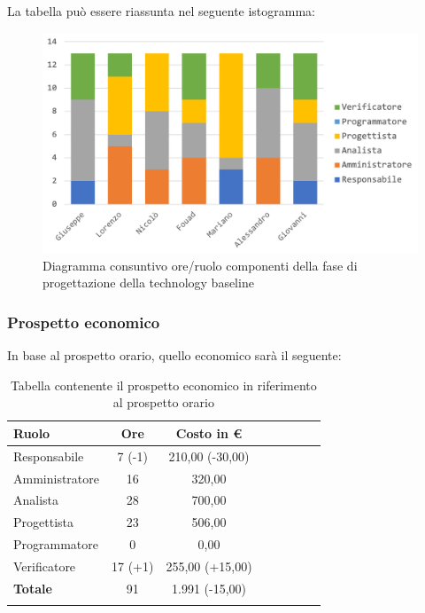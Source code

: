 			La tabella può essere riassunta nel seguente istogramma:
			
			\begin{figure}[H]
				\centering
				\includegraphics[width=0.8\linewidth]{images/consuntivo/ConsCorrez1.png}
				\caption{Diagramma consuntivo ore/ruolo componenti della fase di progettazione della technology baseline}
				\label{fig:consuntivo diagramma suddivione ruoli fase di progettazione della technology baseline}
			\end{figure}
		\pagebreak
			
		\subsubsection{Prospetto economico}
			In base al prospetto orario, quello economico sarà il seguente: 
			
			\begin{longtable}{|l|c|c|c|c|c|c|c}
				\hline
				\rowcolor{lighter-grayer}
				\textbf{Ruolo} & \textbf{Ore} & \textbf{Costo in €} \\
				\hline
				\endfirsthead
				\hline
				Responsabile 	    & 7 (-1) & 210,00 (-30,00)\\
				\hline 
				\hline
				Amministratore	  & 16 & 320,00\\
				\hline
				\hline
				Analista 				& 28 & 700,00\\
				\hline
				\hline
				Progettista 		  & 23 & 506,00\\
				\hline
				\hline
				Programmatore 	 & 0 & 0,00\\
				\hline
				\hline
				Verificatore 		  & 17 (+1) & 255,00 (+15,00)\\
				\hline
				\textbf{Totale} 	& 91 & 1.991 (-15,00)\\
				\hline
				
				\caption{Tabella contenente il prospetto economico in riferimento al prospetto orario}
			\end{longtable}
			
